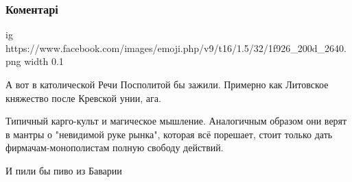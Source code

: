  
 
 
 
 
\subsubsection{Коментарі}

\begin{itemize}
 
\ifcmt
  ig https://www.facebook.com/images/emoji.php/v9/t16/1.5/32/1f926_200d_2640.png
  width 0.1
\fi

 
А вот в католической Речи Посполитой бы зажили. Примерно как Литовское княжество после Кревской унии, ага.

 
Типичный карго-культ и магическое мышление. Аналогичным образом они верят в мантры о "невидимой руке рынка", которая всё порешает, стоит только дать фирмачам-монополистам полную свободу действий.

 
И пили бы пиво из Баварии

 

\end{itemize}
